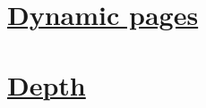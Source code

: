 \documentclass{article}
\begin{document}
\section{\underline{Dynamic pages}}\label{sec:DynamicPages}
\section{\underline{Depth}}\label{sec:Depth}
\end{document}

